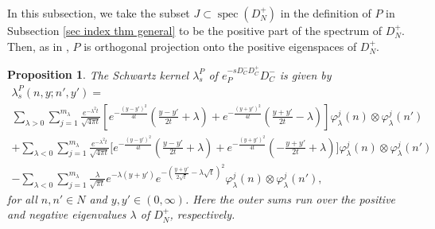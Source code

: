 \documentclass[11pt]{article}
\theoremstyle{plain}
\newtheorem{proposition}[theorem]{Proposition}
\theoremstyle{definition}
\theoremstyle{remark}
\numberwithin{equation}{section}
\DeclareMathOperator{\spec}{spec}
\begin{document}
In this subsection, we take the subset $J \subset \spec(D_N^+)$ in the definition of $P$ in Subsection \ref{sec index thm general} to be the positive part of the spectrum of $D_N^+$. Then, as in \cite{APS1}, $P$ is orthogonal projection onto the positive eigenspaces of $D_N^+$.
\begin{proposition}\label{prop kappa cyl}
The Schwartz kernel $\lambda_s^P$ of $e_P^{-sD_C^-D_C^+}D_C^-$ is given by
\begin{multline} \label{eq tilde kappa s cyl}
\lambda_s^P(n, y; n', y') = \\
%
\sum_{\lambda > 0} \sum_{j=1}^{m_{\lambda}} \frac{e^{-\lambda^2 t}}{\sqrt{4\pi t}}\left[
e^{-\frac{(y-y')^2}{4t}}\left( \frac{y-y'}{2t} +\lambda \right)
+
e^{-\frac{(y+y')^2}{4t}} \left( \frac{y+y'}{2t} - \lambda \right)
 \right]
 \varphi_{\lambda}^j(n) \otimes \varphi_{\lambda}^j(n') \\
+\sum_{\lambda<0}\sum_{j=1}^{m_{\lambda}} \frac{e^{-\lambda^2 t}}{\sqrt{4\pi t}}
\biggl[
 e^{-\frac{(y-y')^2}{4t}} \left(\frac{y-y'}{2t} +\lambda \right)
 + e^{-\frac{(y+y')^2}{4t}}\left( - \frac{y+y'}{2t} + \lambda \right)  \biggr] \varphi_{\lambda}^j(n) \otimes \varphi_{\lambda}^j(n') \\
 -\sum_{\lambda<0}\sum_{j=1}^{m_{\lambda}}  \frac{\lambda}{\sqrt{\pi t}}
  e^{-\lambda(y+y')}e^{-\left(\frac{y+y'}{2\sqrt{t}}-\lambda\sqrt{t}\right)^2}
 \varphi_{\lambda}^j(n) \otimes \varphi_{\lambda}^j(n'),
\end{multline}
for all $n,n' \in N$ and $y,y' \in (0, \infty)$. Here the outer sums run over the positive and negative eigenvalues $\lambda$ of $D_N^+$, respectively.
\end{proposition}
\end{document}
